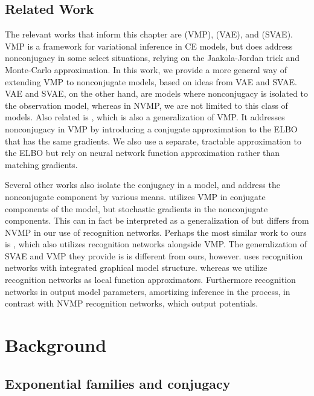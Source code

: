 \subsection{Related Work}
The relevant works that inform this chapter are
\cite{vmp} (VMP), \cite{vae} (VAE), and \cite{svae} (SVAE). 
VMP is a framework for variational inference
in CE models, but does
address nonconjugacy in some select situations,
relying on the Jaakola-Jordan trick \cite{jaakola}
and Monte-Carlo approximation.
In this work, we provide a more general way of extending VMP
to nonconjugate models, based on ideas
from VAE and SVAE. VAE and SVAE,
on the other hand, are models
where nonconjugacy is isolated to the observation model,
whereas in NVMP, we are not limited to this class of models.
Also related is \cite{ncvmp},
which is also a generalization of VMP.
It addresses nonconjugacy in VMP
by introducing a conjugate approximation
to the ELBO
that has the same gradients.
We also use a separate, tractable approximation
to the ELBO but rely on neural network
function approximation rather than matching gradients.

Several other works also
isolate the conjugacy in a model,
and address the nonconjugate component
by various means.
\cite{khan1} utilizes VMP
in conjugate components of the model, but stochastic
gradients in the nonconjugate components. This can in fact
be interpreted as a generalization of \cite{ncvmp}
but differs from NVMP in our use of recognition networks.
Perhaps the most similar work to ours
is \cite{khaaann}, which also utilizes recognition networks
alongside VMP.
The generalization of SVAE and VMP they provide is
is different from ours, however.
\cite{khaaann} uses recognition networks
with integrated graphical model structure.
whereas
we utilize recognition networks as local
function approximators.
Furthermore recognition
networks in \cite{khaaann} output model parameters,
amortizing inference in the process, in contrast with
NVMP recognition networks, which output potentials.

\section{Background}
\label{sec:background}

\subsection{Exponential families and conjugacy}

